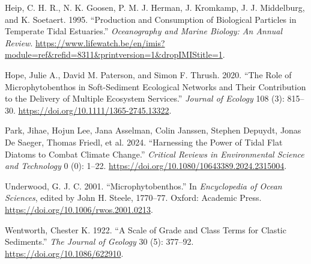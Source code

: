 \documentclass[
  letterpaper,
  DIV=11,
  numbers=noendperiod]{scrartcl}
\newlength{\cslhangindent}
\newenvironment{CSLReferences}[2] %
 {\begin{list}{}{%
  \setlength{\itemindent}{0pt}
  \setlength{\leftmargin}{0pt}
  \setlength{\parsep}{0pt}
  \ifodd #1
   \setlength{\leftmargin}{\cslhangindent}
   \setlength{\itemindent}{-1\cslhangindent}
  \fi
  \setlength{\itemsep}{#2\baselineskip}}}
 {\end{list}}
\begin{document}
\label{refs}
\begin{CSLReferences}{1}{0}
Heip, C. H. R., N. K. Goosen, P. M. J. Herman, J. Kromkamp, J. J.
Middelburg, and K. Soetaert. 1995. {``Production and Consumption of
Biological Particles in Temperate Tidal Estuaries.''} \emph{Oceanography
and Marine Biology: An Annual Review}.
\url{https://www.lifewatch.be/en/imis?module=ref&refid=8311&printversion=1&dropIMIStitle=1}.

Hope, Julie A., David M. Paterson, and Simon F. Thrush. 2020. {``The
Role of Microphytobenthos in Soft-Sediment Ecological Networks and Their
Contribution to the Delivery of Multiple Ecosystem Services.''}
\emph{Journal of Ecology} 108 (3): 815--30.
\url{https://doi.org/10.1111/1365-2745.13322}.

Park, Jihae, Hojun Lee, Jana Asselman, Colin Janssen, Stephen Depuydt,
Jonas De Saeger, Thomas Friedl, et al. 2024. {``Harnessing the Power of
Tidal Flat Diatoms to Combat Climate Change.''} \emph{Critical Reviews
in Environmental Science and Technology} 0 (0): 1--22.
\url{https://doi.org/10.1080/10643389.2024.2315004}.

Underwood, G. J. C. 2001. {``Microphytobenthos.''} In \emph{Encyclopedia
of {Ocean} {Sciences}}, edited by John H. Steele, 1770--77. Oxford:
Academic Press. \url{https://doi.org/10.1006/rwos.2001.0213}.

Wentworth, Chester K. 1922. {``A {Scale} of {Grade} and {Class} {Terms}
for {Clastic} {Sediments}.''} \emph{The Journal of Geology} 30 (5):
377--92. \url{https://doi.org/10.1086/622910}.

\end{CSLReferences}
\end{document}
